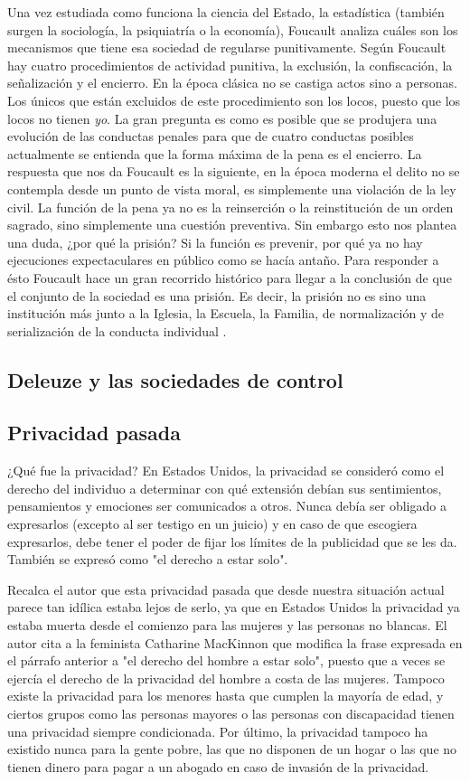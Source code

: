 \documentclass[11pt]{article}
\begin{document}
Una vez estudiada como funciona la ciencia del Estado, la estadística (también surgen la sociología, la psiquiatría o la economía), Foucault analiza cuáles son los mecanismos que tiene esa sociedad de regularse punitivamente. Según Foucault hay cuatro procedimientos de actividad punitiva, la exclusión, la confiscación, la señalización y el encierro. En la época clásica no se castiga actos sino a personas. Los únicos que están excluidos de este procedimiento son los locos, puesto que los locos no tienen \textit{yo}. La gran pregunta es como es posible que se produjera una evolución de las conductas penales para que de cuatro conductas posibles actualmente se entienda que la forma máxima de la pena es el encierro. La respuesta que nos da Foucault es la siguiente, en la época moderna el delito no se contempla desde un punto de vista moral, es simplemente una violación de la ley civil. La función de la pena ya no es la reinserción o la reinstitución de un orden sagrado, sino simplemente una cuestión preventiva. Sin embargo esto nos plantea una duda, ¿por qué la prisión? Si la función es prevenir, por qué ya no hay ejecuciones expectaculares en público como se hacía antaño. Para responder a ésto Foucault hace un gran recorrido histórico para llegar a la conclusión de que el conjunto de la sociedad es una prisión. Es decir, la prisión no es sino una institución más junto a la Iglesia, la Escuela, la Familia, de normalización y de serialización de la conducta individual \cite{ernesto-foucault}.
\subsection{Deleuze y las sociedades de control}
\subsection{Privacidad pasada}
¿Qué fue la privacidad? En Estados Unidos, la privacidad se consideró como el derecho del individuo a determinar con qué extensión debían sus sentimientos, pensamientos y emociones ser comunicados a otros. Nunca debía ser obligado a expresarlos (excepto al ser testigo en un juicio) y en caso de que escogiera expresarlos, debe tener el poder de fijar los límites de la publicidad que se les da. También se expresó como "el derecho a estar solo".

Recalca el autor que esta privacidad pasada que desde nuestra situación actual parece tan idílica estaba lejos de serlo, ya que en Estados Unidos la privacidad ya estaba muerta desde el comienzo para las mujeres y las personas no blancas. El autor cita a la feminista Catharine MacKinnon que modifica la frase expresada en el párrafo anterior a "el derecho del hombre a estar solo", puesto que a veces se ejercía el derecho de la privacidad del hombre a costa de las mujeres. Tampoco existe la privacidad para los menores hasta que cumplen la mayoría de edad, y ciertos grupos como las personas mayores o las personas con discapacidad tienen una privacidad siempre condicionada. Por último, la privacidad tampoco ha existido nunca para la gente pobre, las que no disponen de un hogar o las que no tienen dinero para pagar a un abogado en caso de invasión de la privacidad.
\end{document}
